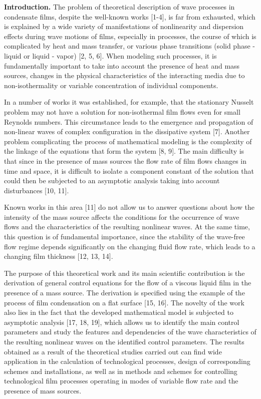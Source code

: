 \begin{multicols}{2}
{\bfseries Introduction.} The problem of theoretical description of wave
processes in condensate films, despite the well-known works {[}1-4{]},
is far from exhausted, which is explained by a wide variety of
manifestations of nonlinearity and dispersion effects during wave
motions of films, especially in processes, the course of which is
complicated by heat and mass transfer, or various phase transitions
(solid phase - liquid or liquid - vapor) {[}2, 5, 6{]}. When modeling
such processes, it is fundamentally important to take into account the
presence of heat and mass sources, changes in the physical
characteristics of the interacting media due to non-isothermality or
variable concentration of individual components.

In a number of works it was established, for example, that the
stationary Nusselt problem may not have a solution for non-isothermal
film flows even for small Reynolds numbers. This circumstance leads to
the emergence and propagation of non-linear waves of complex
configuration in the dissipative system {[}7{]}. Another problem
complicating the process of mathematical modeling is the complexity of
the linkage of the equations that form the system {[}8, 9{]}. The main
difficulty is that since in the presence of mass sources the flow rate
of film flows changes in time and space, it is difficult to isolate a
component constant of the solution that could then be subjected to an
asymptotic analysis taking into account disturbances {[}10, 11{]}.

Known works in this area {[}11{]} do not allow us to answer questions
about how the intensity of the mass source affects the conditions for
the occurrence of wave flows and the characteristics of the resulting
nonlinear waves. At the same time, this question is of fundamental
importance, since the stability of the wave-free flow regime depends
significantly on the changing fluid flow rate, which leads to a changing
film thickness {[}12, 13, 14{]}.

The purpose of this theoretical work and its main scientific
contribution is the derivation of general control equations for the flow
of a viscous liquid film in the presence of a mass source. The
derivation is specified using the example of the process of film
condensation on a flat surface {[}15, 16{]}. The novelty of the work
also lies in the fact that the developed mathematical model is subjected
to asymptotic analysis {[}17, 18, 19{]}, which allows us to identify the
main control parameters and study the features and dependencies of the
wave characteristics of the resulting nonlinear waves on the identified
control parameters. The results obtained as a result of the theoretical
studies carried out can find wide application in the calculation of
technological processes, design of corresponding schemes and
installations, as well as in methods and schemes for controlling
technological film processes operating in modes of variable flow rate
and the presence of mass sources.


\end{multicols}
